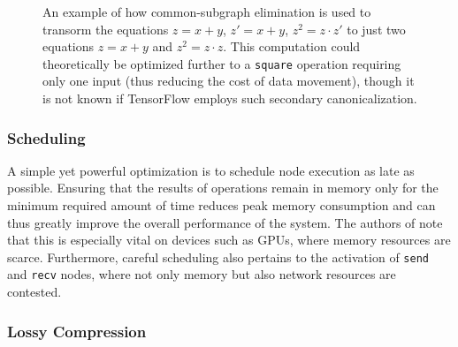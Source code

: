 \begin{figure}
\begin{subfigure}[h]{0.5\textwidth}
  \end{subfigure}
  \label{fig:subgraph-elim}
  \caption{An example of how common-subgraph elimination is used to transorm the
    equations $z = x + y$, $z' = x + y$, $z^2 = z \cdot z'$ to just two
    equations $z = x + y$ and $z^2 = z \cdot z$. This computation could
    theoretically be optimized further to a \texttt{square} operation requiring
    only one input (thus reducing the cost of data movement), though it is not
    known if TensorFlow employs such secondary canonicalization.}
\end{figure}

\subsubsection{Scheduling}\label{sec:model-optim-schedule}

A simple yet powerful optimization is to schedule node execution as late as
possible. Ensuring that the results of operations remain in memory only for the
minimum required amount of time reduces peak memory consumption and can thus
greatly improve the overall performance of the system. The authors of
\cite{tensorflow} note that this is especially vital on devices such as GPUs,
where memory resources are scarce. Furthermore, careful scheduling also pertains
to the activation of \texttt{send} and \texttt{recv} nodes, where not only
memory but also network resources are contested.

\subsubsection{Lossy Compression}\label{sec:model-optim-lossy}

